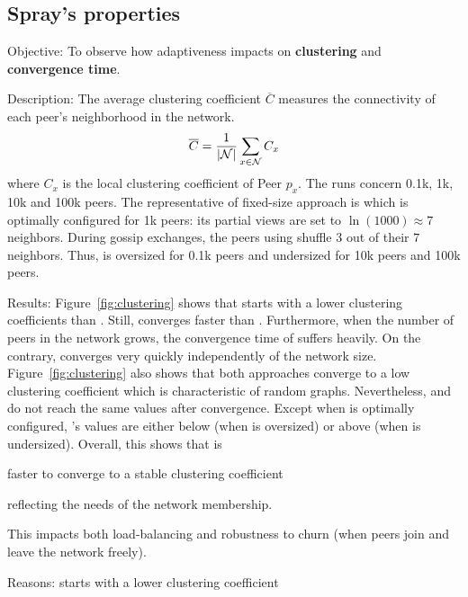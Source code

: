 \subsection{Spray's properties}

\begin{asparadesc}
\item[Objective:] To observe how adaptiveness impacts on \textbf{clustering} and
  \textbf{convergence time}.
\item[Description:] The average clustering coefficient $\overline{C}$ measures
  the connectivity of each peer's neighborhood in the network.
  \begin{equation}
    \overline{C} = {1\over |\mathcal{N}|}\sum\limits_{x\in\mathcal{N}}C_x
  \end{equation}
  where $C_x$ is the local clustering coefficient of Peer $p_x$.  The
  runs concern 0.1k, 1k, 10k and 100k peers. The representative of
  fixed-size approach is \CYCLON which is optimally configured for 1k
  peers: its partial views are set to $\ln(1000)\approx 7$
  neighbors. During gossip exchanges, the peers using \CYCLON shuffle
  $3$ out of their $7$ neighbors. Thus, \CYCLON is oversized for 0.1k
  peers and undersized for 10k peers and 100k peers.
\item[Results:] Figure~\ref{fig:clustering} shows that \CYCLON starts
  with a lower clustering coefficients than \SPRAY. Still, \SPRAY
  converges faster than \CYCLON. Furthermore, when the number of peers
  in the network grows, the convergence time of \CYCLON suffers
  heavily. On the contrary, \SPRAY converges very quickly
  independently of the network size. Figure~\ref{fig:clustering} also
  shows that both approaches converge to a low clustering coefficient
  which is characteristic of random graphs. Nevertheless, \CYCLON and
  \SPRAY do not reach the same values after convergence. Except when
  \CYCLON is optimally configured, \SPRAY's values are either below
  (when \CYCLON is oversized) or above (when \CYCLON is undersized).
  Overall, this shows that \SPRAY is
  \begin{inparaenum}
  \item faster to converge to a stable clustering coefficient
  \item reflecting the needs of the network membership.
  \end{inparaenum}
  This impacts both load-balancing and robustness to churn (when peers
  join and leave the network freely).
\item[Reasons:] \CYCLON starts with a lower clustering coefficient

\end{asparadesc}
